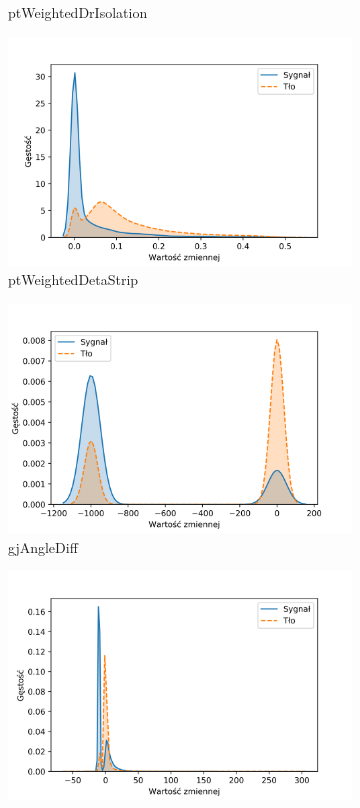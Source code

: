 \documentclass{pracalicmgr}
\begin{document}
\begin{figure}[H]
\begin{subfigure}{.5\textwidth}
	\caption{ptWeightedDrIsolation}
	\end{subfigure}
	\begin{subfigure}{.5\textwidth}
	\centering
	\includegraphics[width=1\textwidth]{difference_ptWeightedDetaStrip.png}
	\caption{ptWeightedDetaStrip}
	\end{subfigure}
	\begin{subfigure}{.5\textwidth}
	\centering
	\includegraphics[width=1\textwidth]{difference_gjAngleDiff.png}
	\caption{gjAngleDiff}
	\end{subfigure}
	\begin{subfigure}{.5\textwidth}
	\centering
	\includegraphics[width=1\textwidth]{difference_flightLengthSig.png}

\end{subfigure}
\end{figure}
\end{document}
